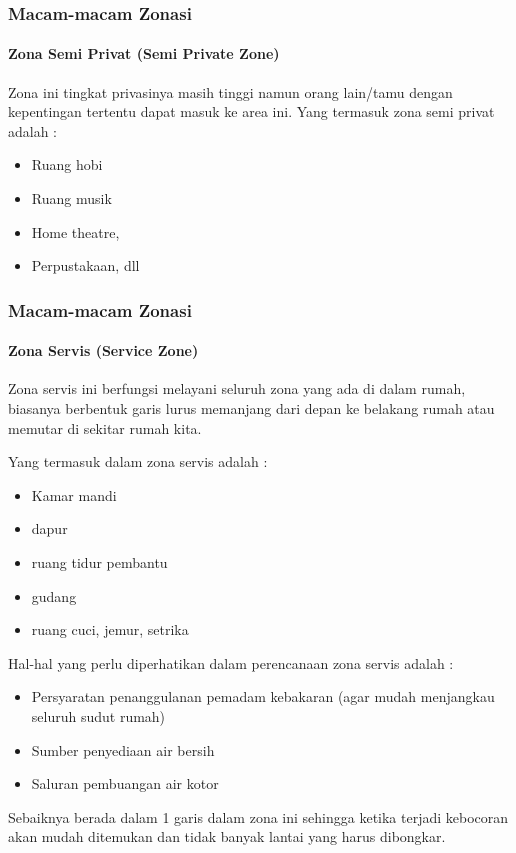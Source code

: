 \documentclass[../spa_2.tex]{subfiles}
\begin{document}
\begin{frame}[mytitle=standard,c,mycolor=digiPH_uniblue,light]

	\frametitle{Macam-macam Zonasi}
	\framesubtitle{Zona Semi Privat (Semi Private Zone)}
	Zona ini tingkat privasinya masih tinggi namun orang lain/tamu dengan kepentingan tertentu dapat masuk ke area ini. Yang termasuk zona semi privat adalah :

	\begin{itemize}
		\item Ruang hobi
		\item Ruang musik
		\item Home theatre,
		\item Perpustakaan, dll
	\end{itemize}\end{frame}

\begin{frame}[mytitle=standard,c,mybg=bglight2,light]

	\frametitle{Macam-macam Zonasi}
	\framesubtitle{Zona Servis (Service Zone)}

	Zona servis ini berfungsi melayani seluruh zona yang ada di dalam rumah, biasanya berbentuk garis lurus memanjang dari depan ke belakang rumah  atau memutar di sekitar rumah kita.

	Yang termasuk dalam zona servis adalah :
	\begin{itemize}
		\item Kamar mandi
		\item dapur
		\item ruang tidur pembantu
		\item gudang
		\item ruang cuci, jemur, setrika
	\end{itemize}

\end{frame}



\begin{frame}[mytitle=standard,c,mycolor=digiPH_leaf,dark]

	\begin{center}
		Hal-hal yang perlu diperhatikan dalam perencanaan zona servis adalah :
	\end{center}

	\begin{itemize}
		\item Persyaratan penanggulanan pemadam kebakaran (agar mudah menjangkau seluruh sudut rumah)
		\item Sumber penyediaan air bersih
		\item Saluran pembuangan air kotor
	\end{itemize}

	Sebaiknya berada dalam 1 garis dalam zona ini sehingga ketika  terjadi kebocoran akan mudah ditemukan dan tidak banyak lantai yang harus dibongkar.
\end{frame}
\end{document}
